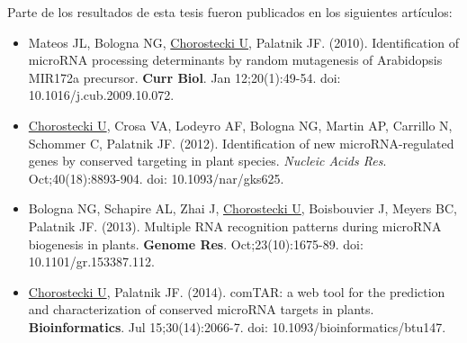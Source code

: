 
Parte de los resultados de esta tesis fueron publicados en los siguientes artículos:

\begin{itemize}

    \item Mateos JL, Bologna NG, \underline{Chorostecki U}, Palatnik JF. (2010). Identification of microRNA processing determinants by random mutagenesis of Arabidopsis MIR172a precursor. \textbf{Curr Biol}. Jan 12;20(1):49-54. doi: 10.1016/j.cub.2009.10.072.
    \item \underline{Chorostecki U}, Crosa VA, Lodeyro AF, Bologna NG, Martin AP, Carrillo N, Schommer C, Palatnik JF. (2012). Identification of new microRNA-regulated genes by conserved targeting in plant species. \textit{Nucleic Acids Res}. Oct;40(18):8893-904. doi: 10.1093/nar/gks625.
    \item Bologna NG, Schapire AL, Zhai J, \underline{Chorostecki U}, Boisbouvier J, Meyers BC, Palatnik JF. (2013). Multiple RNA recognition patterns during microRNA biogenesis in plants. \textbf{Genome Res}. Oct;23(10):1675-89. doi: 10.1101/gr.153387.112.
    \item \underline{Chorostecki U}, Palatnik JF. (2014). comTAR: a web tool for the prediction and characterization of conserved microRNA targets in plants. \textbf{Bioinformatics}. Jul 15;30(14):2066-7. doi: 10.1093/bioinformatics/btu147.
\end{itemize}
